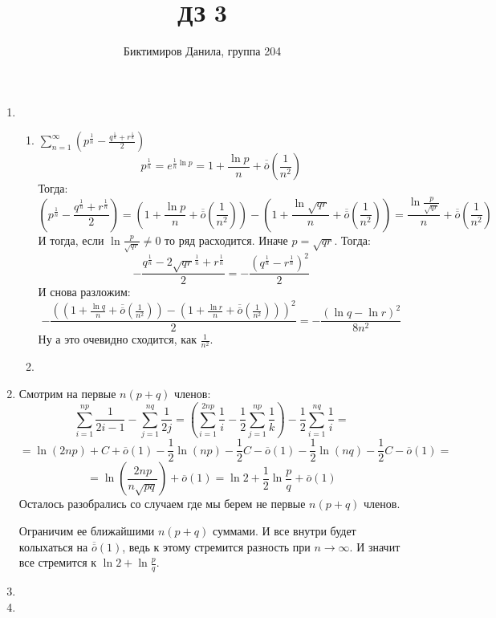 \documentclass[11pt]{article}
\begin{document}
	
	\author{Биктимиров Данила, группа 204}
	\title{ДЗ 3}
	\date{}
	\maketitle
	
	\medskip
	
	\begin{enumerate}
		
		\item \begin{enumerate}
			\item $\sum_{n=1}^{\infty} \left(p^{\frac{1}{n}}-\frac{q^{\frac{1}{n}} + r^{\frac{1}{n}}}{2} \right)$
			$$p^{\frac{1}{n}} = e^{\frac{1}{n}\ln p}=1+\frac{\ln p}{n} + \overline{\overline{o}} \left(\frac{1}{n^2}\right)$$
			Тогда: $$ \left(p^{\frac{1}{n}} - \frac{q^{\frac{1}{n}} + r^{\frac{1}{n}}}{2} \right) = \left(1+\frac{\ln p}{n} + \overline{\overline{o}} \left(\frac{1}{n^2}\right)\right)-\left( 1+\frac{\ln \sqrt{qr}}{n} + \overline{\overline{o}} \left(\frac{1}{n^2}\right) \right)=\frac{\ln{\frac{p}{\sqrt{qr}}}}{n}+\overline{\overline{o}}\left(\frac{1}{n^2}\right)$$
			И тогда, если $\ln \frac{p}{\sqrt{qr}}\not=0$ то ряд расходится. Иначе $p=\sqrt{qr}$. Тогда: $$-\frac{q^\frac{1}{n}-2\sqrt{qr}^{\frac{1}{n}}+r^\frac{1}{n}}{2}=-\frac{\left(q^{\frac{1}{n}}-r^{\frac{1}{n}}\right)^2}{2}$$
			И снова разложим: $$-\frac{\left(\left(1+\frac{\ln q}{n} + \overline{\overline{o}} \left(\frac{1}{n^2}\right)\right)-\left(1+\frac{\ln r}{n} + \overline{\overline{o}} \left(\frac{1}{n^2}\right)\right)\right)^2}{2}=-\frac{\left(\ln q - \ln r\right)^2}{8n^2}$$
			Ну а это очевидно сходится, как $\frac{1}{n^2}$.
			
			\item
		\end{enumerate}
		\item Смотрим на первые $n(p+q)$ членов: $$ \sum_{i=1}^{np} \frac{1}{2i-1} - \sum_{j=1}^{nq} \frac{1}{2j} =\left(\sum_{i=1}^{2np} \frac{1}{i} - \frac{1}{2} \sum_{j=1}^{np} \frac{1}{k}\right) - \frac{1}{2} \sum_{i=1}^{nq} \frac{1}{i} =$$ $$ =\ln (2np) + C +\overline{o}(1) - \frac{1}{2} \ln (np) - \frac{1}{2}C-\overline{o}(1)-\frac{1}{2}\ln (nq) -  \frac{1}{2} C -\overline{o}(1) =$$ $$ = \ln \left(\frac{2np}{n\sqrt{pq}}\right) + \overline{o}(1) = \ln 2 + \frac{1}{2}\ln\frac{p}{q} + \overline{o}(1)$$
		Осталось разобрались со случаем где мы берем не первые $n(p+q)$ членов.
		
		Ограничим ее ближайшими $n(p+q)$ суммами. И все внутри будет колыхаться на $\overline{\overline{o}}(1)$, ведь к этому стремится разность при $n\to \infty$. И значит все стремится к $\ln 2 + \ln \frac{p}{q}$.
		
		\item
		
		\item
		
	\end{enumerate}
\end{document}
